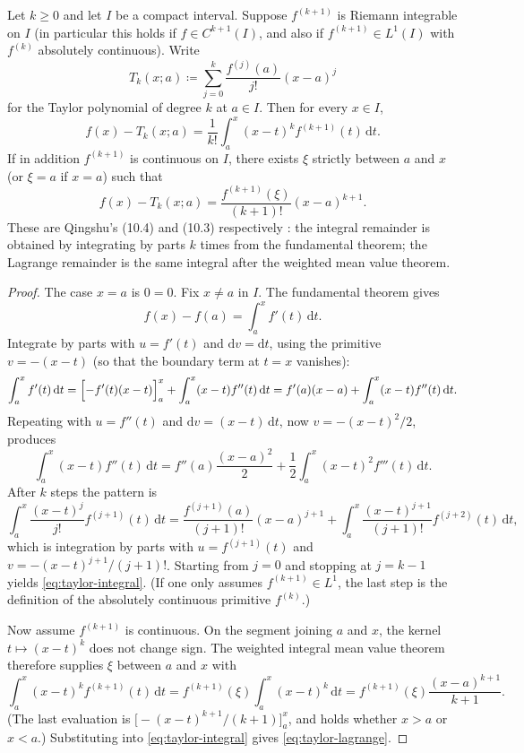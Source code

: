 \documentclass[11pt,a4paper]{article}
\begin{document}
\begin{proposition}
\label{prop:taylor-ibp}
Let \(k\ge 0\) and let \(I\) be a compact interval. Suppose \(f^{(k+1)}\) is Riemann integrable on \(I\) (in particular this holds if \(f\in C^{k+1}(I)\), and also if \(f^{(k+1)}\in L^{1}(I)\) with \(f^{(k)}\) absolutely continuous). Write
\[
T_{k}(x;a)
\coloneqq
\sum_{j=0}^{k}\frac{f^{(j)}(a)}{j!}(x-a)^{j}
\]
for the Taylor polynomial of degree \(k\) at \(a\in I\). Then for every \(x\in I\),
\begin{equation}
\label{eq:taylor-integral}
f(x)-T_{k}(x;a)
=
\frac{1}{k!}
\int_{a}^{x}(x-t)^{k}f^{(k+1)}(t)\,\mathrm{d}t.
\end{equation}
If in addition \(f^{(k+1)}\) is continuous on \(I\), there exists \(\xi\) strictly between \(a\) and \(x\) (or \(\xi=a\) if \(x=a\)) such that
\begin{equation}
\label{eq:taylor-lagrange}
f(x)-T_{k}(x;a)
=
\frac{f^{(k+1)}(\xi)}{(k+1)!}(x-a)^{k+1}.
\end{equation}
These are Qingshu's (10.4) and (10.3) respectively \cite{qingshu11}: the integral remainder is obtained by integrating by parts \(k\) times from the fundamental theorem; the Lagrange remainder is the same integral after the weighted mean value theorem.
\end{proposition}

\begin{proof}
The case \(x=a\) is \(0=0\). Fix \(x\neq a\) in \(I\). The fundamental theorem gives
\[
f(x)-f(a)
=
\int_{a}^{x}f'(t)\,\mathrm{d}t.
\]
Integrate by parts with \(u=f'(t)\) and \(\mathrm{d}v=\mathrm{d}t\), using the primitive \(v=-(x-t)\) (so that the boundary term at \(t=x\) vanishes):
\[
\int_{a}^{x}f'(t)\,\mathrm{d}t
=
\Bigl[-f'(t)(x-t)\Bigr]_{a}^{x}
+
\int_{a}^{x}(x-t)f''(t)\,\mathrm{d}t
=
f'(a)(x-a)
+
\int_{a}^{x}(x-t)f''(t)\,\mathrm{d}t.
\]
Repeating with \(u=f''(t)\) and \(\mathrm{d}v=(x-t)\,\mathrm{d}t\), now \(v=-(x-t)^{2}/2\), produces
\[
\int_{a}^{x}(x-t)f''(t)\,\mathrm{d}t
=
f''(a)\frac{(x-a)^{2}}{2}
+
\frac{1}{2}
\int_{a}^{x}(x-t)^{2}f'''(t)\,\mathrm{d}t.
\]
After \(k\) steps the pattern is
\[
\int_{a}^{x}\frac{(x-t)^{j}}{j!}f^{(j+1)}(t)\,\mathrm{d}t
=
\frac{f^{(j+1)}(a)}{(j+1)!}(x-a)^{j+1}
+
\int_{a}^{x}\frac{(x-t)^{j+1}}{(j+1)!}f^{(j+2)}(t)\,\mathrm{d}t,
\]
which is integration by parts with \(u=f^{(j+1)}(t)\) and \(v=-(x-t)^{j+1}/(j+1)!\). Starting from \(j=0\) and stopping at \(j=k-1\) yields \eqref{eq:taylor-integral}. (If one only assumes \(f^{(k+1)}\in L^{1}\), the last step is the definition of the absolutely continuous primitive \(f^{(k)}\).)

Now assume \(f^{(k+1)}\) is continuous. On the segment joining \(a\) and \(x\), the kernel \(t\mapsto(x-t)^{k}\) does not change sign. The weighted integral mean value theorem therefore supplies \(\xi\) between \(a\) and \(x\) with
\[
\int_{a}^{x}(x-t)^{k}f^{(k+1)}(t)\,\mathrm{d}t
=
f^{(k+1)}(\xi)
\int_{a}^{x}(x-t)^{k}\,\mathrm{d}t
=
f^{(k+1)}(\xi)\frac{(x-a)^{k+1}}{k+1}.
\]
(The last evaluation is \(\bigl[-(x-t)^{k+1}/(k+1)\bigr]_{a}^{x}\), and holds whether \(x>a\) or \(x<a\).) Substituting into \eqref{eq:taylor-integral} gives \eqref{eq:taylor-lagrange}.
\end{proof}
\end{document}
